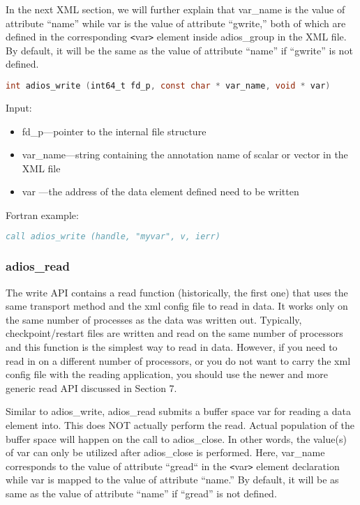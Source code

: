 In the next XML section, we will further explain that var\_name is the value of 
attribute ``name'' while var is the value of attribute ``gwrite,'' both of which 
are defined in the corresponding \texttt{<}var\texttt{>} element inside adios\_group 
in the XML file. By default, it will be the same as the value of attribute ``name'' 
if ``gwrite'' is not defined. 

\begin{lstlisting}[language=C,caption={},label={}]
int adios_write (int64_t fd_p, const char * var_name, void * var)
\end{lstlisting}

Input:
\begin{itemize}
\item fd\_p---pointer to the internal file structure
\item var\_name---string containing the annotation name of scalar or vector in the XML file
\item var ---the address of the data element defined need to be written
\end{itemize}

Fortran example: 
\begin{lstlisting}[language=Fortran,caption={},label={}]
call adios_write (handle, "myvar", v, ierr)
\end{lstlisting}

\subsubsection{adios\_read}
\label{section:adios_read}

The write API contains a read function (historically, the first one) that uses 
the same transport method and the xml config file to read in data. It works only 
on the same number of processes as the data was written out. Typically, checkpoint/restart 
files are written and read on the same number of processors and this function is 
the simplest way to read in data. However, if you need to read in on a different 
number of processors, or you do not want to carry the xml config file with the 
reading application, you should use the newer and more generic read API discussed 
in Section 7.

Similar to adios\_write, {\color{color01} adios\_read submits a buffer space var 
for reading a data element into. This does NOT actually perform the read. Actual 
population of the buffer space will happen on the call to adios\_close. In other 
words, the value(s) of var can only be utilized after adios\_close is performed. 
Here, }var\_name corresponds to the value of attribute ``gread`` in the \texttt{<}var\texttt{>} 
element declaration while var is mapped to the value of attribute ``name.'' By 
default, it will be as same as the value of attribute ``name'' if ``gread'' is 
not defined.

